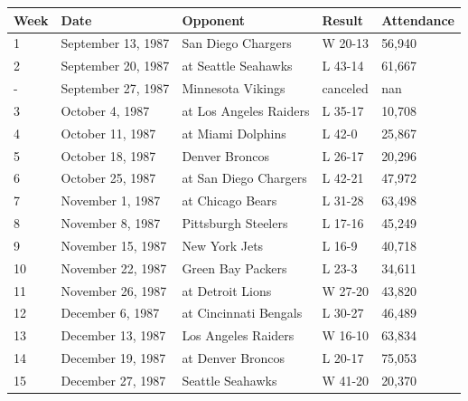 \documentclass{article}
\begin{document}
\begin{tabular}{lllll}
\toprule
Week & Date & Opponent & Result & Attendance \\
\midrule
1 & September 13, 1987 & San Diego Chargers & W 20-13 & 56,940 \\
2 & September 20, 1987 & at Seattle Seahawks & L 43-14 & 61,667 \\
- & September 27, 1987 & Minnesota Vikings & canceled & nan \\
3 & October 4, 1987 & at Los Angeles Raiders & L 35-17 & 10,708 \\
4 & October 11, 1987 & at Miami Dolphins & L 42-0 & 25,867 \\
5 & October 18, 1987 & Denver Broncos & L 26-17 & 20,296 \\
6 & October 25, 1987 & at San Diego Chargers & L 42-21 & 47,972 \\
7 & November 1, 1987 & at Chicago Bears & L 31-28 & 63,498 \\
8 & November 8, 1987 & Pittsburgh Steelers & L 17-16 & 45,249 \\
9 & November 15, 1987 & New York Jets & L 16-9 & 40,718 \\
10 & November 22, 1987 & Green Bay Packers & L 23-3 & 34,611 \\
11 & November 26, 1987 & at Detroit Lions & W 27-20 & 43,820 \\
12 & December 6, 1987 & at Cincinnati Bengals & L 30-27 & 46,489 \\
13 & December 13, 1987 & Los Angeles Raiders & W 16-10 & 63,834 \\
14 & December 19, 1987 & at Denver Broncos & L 20-17 & 75,053 \\
15 & December 27, 1987 & Seattle Seahawks & W 41-20 & 20,370 \\
\bottomrule
\end{tabular}
\end{document}
